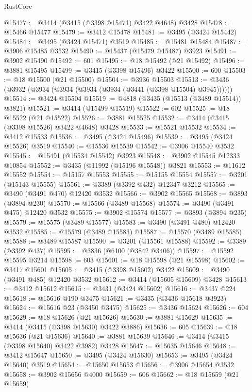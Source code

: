 \begin{lexlean}{RustCore}
\begin{coremodule}
@15477 := @3414 (@3415 (@3398 @15471) @3422 @4648) @3428
@15478 := @15466 @15477
@15479 := @3412 @15478
@15481 := @3495 (@3424 @15442)
@15484 := @3495 (@3424 @15471) @3519
@15485 := @15481 @15484
@15487 := @3906 @15485 @3532
@15490 := @15437 (@15479 @15487) @3923
@15491 := @3902 @15490
@15492 := 601
@15495 := @18 @15492 (@21 @15492)
@15496 := @3881 @15495
@15499 := @3415 (@3398 @15496) @3422
@15500 := 600
@15503 := @18 @15500 (@21 @15500)
@15504 := @3936 @15503
@15513 := @3436 (@3932 (@3934 (@3934 (@3934 (@3934 (@3441 (@3398 @15504) @3945))))))
@15514 := @3424 @15504
@15519 := @4818 (@3435 (@15513 (@3489 @15514)) @3821)
@15521 := @3414 (@15499 @15519)
@15522 := 602
@15525 := @18 @15522 (@21 @15522)
@15526 := @3881 @15525
@15532 := @3414 (@3415 (@3398 @15526) @3422 @4648) @3428
@15533 := @15521 @15532
@15534 := @3412 @15533
@15536 := @3495 (@3424 @15496)
@15539 := @3495 (@3424 @15526) @3519
@15540 := @15536 @15539
@15542 := @3906 @15540 @3532
@15545 := @15491 (@15534 @15542) @3923
@15548 := @3902 @15545 @12333 @10854
@15552 := @3435 (@11992 (@15196 @15548)) @3821
@15553 := @11612 @15552
@15554 := @15157 @15553
@15555 := @15155 @15554
@15557 := @3201 (@15143 @15555)
@15561 := @3389 (@3392 @432) @12347 @3212
@15565 := @3490 (@3491 @470) @12420 @3532
@15566 := @3902 @15565
@15568 := @3893 (@3894 @230)
@15570 := @15566 (@3489 @15568)
@15574 := @3490 (@3491 @475) @12420 @3532
@15575 := @3902 @15574
@15577 := @3893 (@3894 @235)
@15579 := @15575 (@3489 @15577)
@15583 := @3490 (@3491 @480) @12420 @3532
@15585 := @15579 (@3489 @15583)
@15587 := @15570 (@3489 @15585)
@15588 := @3489 @15587
@15590 := @3201 (@15561 @15588)
@15592 := @3389 (@3392 @437)
@15595 := @3836 (@6100 (@3842 @3406))
@15597 := @15592 @15595 @3214
@15598 := 603
@15601 := @18 @15598 (@21 @15598)
@15602 := @3417 @15601
@15605 := @3415 (@3398 @15602) @3422
@15609 := @3490 (@3491 @485) @12420 @3532
@15612 := @3414 (@15605 @15609) @3428
@15613 := @3412 @15612
@15615 := @3431 (@3424 @15602)
@15616 := @3437 @224
@15618 := @15616 @190 @3475
@15621 := @3435 (@3436 @15618 @3923)
@15624 := @15616 @23 (@3450 @3475)
@15625 := @3436 @15624
@15626 := 604
@15629 := @18 @15626 (@21 @15626)
@15630 := @3881 @15629
@15635 := @3414 (@3415 (@3398 @15630) @3422 @3886)
@15636 := 605
@15639 := @18 @15636 (@21 @15636)
@15640 := @3881 @15639
@15646 := @3414 (@3415 (@3398 @15640) @3422 @3982) @3428
@15647 := @15635 @15646
@15648 := @3412 @15647
@15650 := @3495 (@3424 @15630)
@15653 := @3495 (@3424 @15640) @3519
@15654 := @15650 @15653
@15656 := @3906 @15654 @3532
@15658 := @3902 @15656 @4000
@15659 := 606
@15662 := @18 @15659 (@21 @15659)

\end{coremodule}
\end{lexlean}
